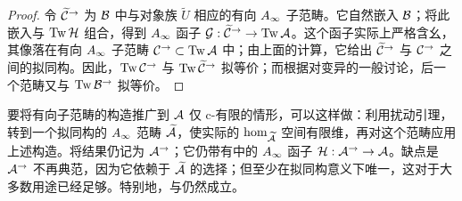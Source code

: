 \begin{proof}
令 $\widetilde{\mathcal C}^{\to}$ 为 $\mathcal B$ 中与对象族 $\widetilde U$ 相应的有向 $A_\infty$ 子范畴。它自然嵌入 $\mathcal B$；将此嵌入与 $\operatorname{Tw}\mathcal H$ 组合，得到 $A_\infty$ 函子 $\mathcal G:\widetilde{\mathcal C}^{\to}\to\operatorname{Tw}\mathcal A$。这个函子实际上严格含幺，其像落在有向 $A_\infty$ 子范畴 $\mathcal C^{\to}\subset\operatorname{Tw}\mathcal A$ 中；由上面的计算，它给出 $\widetilde{\mathcal C}^{\to}$ 与 $\mathcal C^{\to}$ 之间的拟同构。因此，$\operatorname{Tw}\mathcal C^{\to}$ 与 $\operatorname{Tw}\widetilde{\mathcal C}^{\to}$ 拟等价；而根据对变异的一般讨论，后一个范畴又与 $\operatorname{Tw}\mathcal B^{\to}$ 拟等价。
\end{proof}
要将有向子范畴的构造推广到 $\mathcal A$ 仅 c-有限的情形，可以这样做：利用扰动引理，转到一个拟同构的 $A_\infty$ 范畴 $\widetilde{\mathcal A}$，使实际的 $\hom_{\widetilde{\mathcal A}}$ 空间有限维，再对这个范畴应用上述构造。将结果仍记为 $\mathcal A^{\to}$；它仍带有中的 $A_\infty$ 函子 $\mathcal H:\mathcal A^{\to}\to\mathcal A$。缺点是 $\mathcal A^{\to}$ 不再典范，因为它依赖于 $\widetilde{\mathcal A}$ 的选择；但至少在拟同构意义下唯一，这对于大多数用途已经足够。特别地，与仍然成立。

